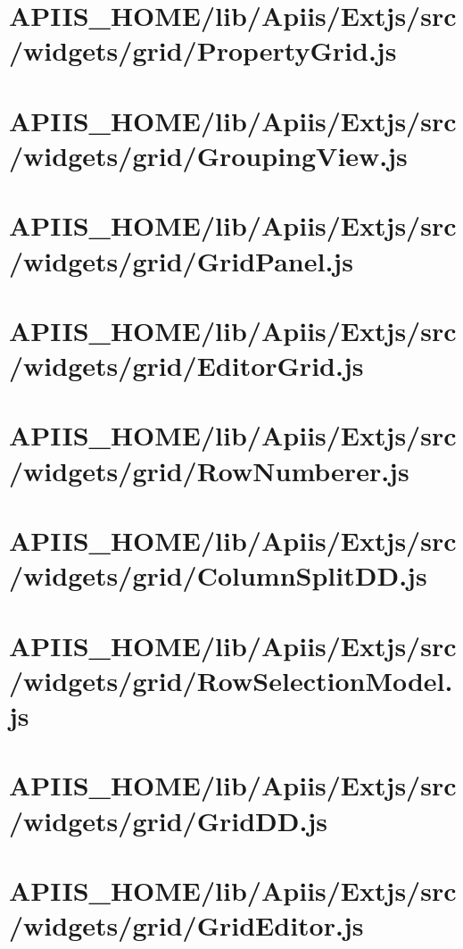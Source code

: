 \section{APIIS\_HOME/lib/Apiis/Extjs/src/widgets/grid/PropertyGrid.js} 
\section{APIIS\_HOME/lib/Apiis/Extjs/src/widgets/grid/GroupingView.js} 
\section{APIIS\_HOME/lib/Apiis/Extjs/src/widgets/grid/GridPanel.js} 
\section{APIIS\_HOME/lib/Apiis/Extjs/src/widgets/grid/EditorGrid.js} 
\section{APIIS\_HOME/lib/Apiis/Extjs/src/widgets/grid/RowNumberer.js} 
\section{APIIS\_HOME/lib/Apiis/Extjs/src/widgets/grid/ColumnSplitDD.js} 
\section{APIIS\_HOME/lib/Apiis/Extjs/src/widgets/grid/RowSelectionModel.js} 
\section{APIIS\_HOME/lib/Apiis/Extjs/src/widgets/grid/GridDD.js} 
\section{APIIS\_HOME/lib/Apiis/Extjs/src/widgets/grid/GridEditor.js} 
